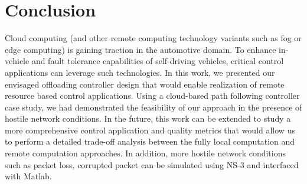 \section{Conclusion}
\label{sec:concl}
Cloud computing (and other remote computing technology variants such as fog or edge computing) is gaining traction in the automotive domain. To enhance in-vehicle and fault tolerance capabilities of self-driving vehicles, critical control applications can leverage such technologies. In this work, we presented our envisaged offloading controller design that would enable realization of remote resource based control applications. Using a cloud-based path following controller case study, we had demonstrated the feasibility of our approach in the presence of hostile network conditions. 
In the future, this work can be extended to study a more comprehensive control application and quality metrics that would allow us to perform a detailed trade-off analysis between the fully local computation and remote computation approaches. In addition, more hostile network conditions such as packet loss, corrupted packet can be simulated using NS-3 and interfaced with Matlab.
